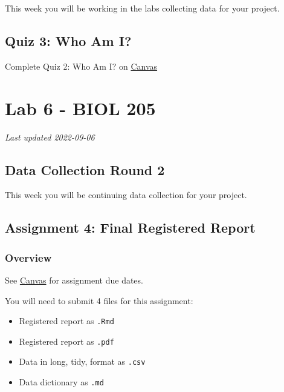 \documentclass[
]{book}
\providecommand{\tightlist}{%
  \setlength{\itemsep}{0pt}\setlength{\parskip}{0pt}}
\begin{document}
This week you will be working in the labs collecting data for your project.

\hypertarget{quiz-3-who-am-i}{%
\chapter*{Quiz 3: Who Am I?}\label{quiz-3-who-am-i}}

Complete Quiz 2: Who Am I? on \href{https://canvas.ubc.ca/courses/113910}{Canvas}

\hypertarget{part-lab-6---biol-205}{%
\part*{Lab 6 - BIOL 205}\label{part-lab-6---biol-205}}

\emph{Last updated 2022-09-06}

\hypertarget{data-collection-round-2}{%
\chapter*{Data Collection Round 2}\label{data-collection-round-2}}

This week you will be continuing data collection for your project.

\hypertarget{assignment-4-final-registered-report}{%
\chapter*{Assignment 4: Final Registered Report}\label{assignment-4-final-registered-report}}

\hypertarget{overview-2}{%
\section*{Overview}\label{overview-2}}

See \href{https://canvas.ubc.ca}{Canvas} for assignment due dates.

You will need to submit 4 files for this assignment:

\begin{itemize}
\tightlist
\item
  Registered report as \texttt{.Rmd}
\item
  Registered report as \texttt{.pdf}
\item
  Data in long, tidy, format as \texttt{.csv}
\item
  Data dictionary as \texttt{.md}
\end{itemize}
\end{document}
